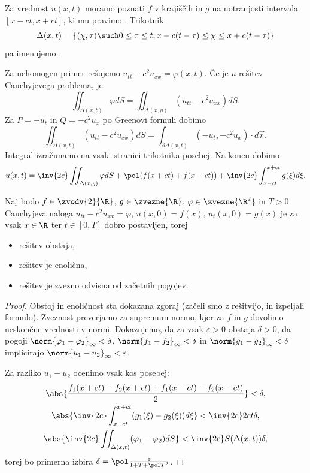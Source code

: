 
Za vrednost $u(x,t)$ moramo poznati $f$ v krajiščih in $g$ na notranjosti
intervala $[x-ct, x+ct]$, ki mu pravimo .
Trikotnik
\[
  \Delta(x,t) = \{ (\chi, \tau) \such 0 \le \tau \le t, x - c (t-\tau) \le \chi \le
  x + c (t-\tau) \}
\]
pa imenujemo .

Za nehomogen primer rešujemo $u_{tt} - c^2 u_{xx} = \varphi(x, t)$.
Če je $u$ rešitev Cauchyjevega problema, je
\[
  \iint_{\Delta(x,t)} \varphi dS = \iint_{\Delta(x,y)} (u_{tt} - c^2 u_{xx}) dS.
\]
Za $P = - u_t$ in $Q = -c^2 u_x$ po Greenovi formuli dobimo
\[
  \iint_{\Delta(x,t)} (u_{tt} - c^2 u_{xx}) dS
  = \int_{\partial \Delta(x,t)} (-u_t, -c^2 u_x) \cdot d\vec{r}.
\]
Integral izračunamo na vsaki stranici trikotnika posebej.
Na koncu dobimo
\[
  u(x,t) = \inv{2c} \iint_{\Delta(x,y)} \varphi dS
  + \pol (f(x+ct) + f(x - ct)) + \inv{2c} \int_{x-ct}^{x+ct} g(\xi) d\xi.
\]


\begin{izrek}
  Naj bodo $f \in \zvodv{2}{\R}$, $g \in \zvezne{\R}$, $\varphi \in
  \zvezne{\R^2}$ in $T > 0$.
  Cauchyjeva naloga $u_{tt} - c^2 u_{xx} = \varphi$, $u(x,0) = f(x)$,
  $u_t(x,0) = g(x)$ je za vsak $x \in \R$ ter $t \in [0,T]$ dobro postavljen,
  torej
  \begin{itemize}
  \item rešitev obstaja,
  \item rešitev je enolična,
  \item rešitev je zvezno odvisna od začetnih pogojev.
  \end{itemize}
\end{izrek}

\begin{proof}
  Obstoj in enoličnost sta dokazana zgoraj (začeli smo z rešitvijo, in izpeljali
  formulo).
  Zveznost preverjamo za supremum normo, kjer za $f$ in $g$ dovolimo neskončne
  vrednosti v normi.
  Dokazujemo, da za vsak $\varepsilon > 0$ obstaja $\delta > 0$, da pogoji
  $\norm{\varphi_1 - \varphi_2}_\infty < \delta$, $\norm{f_1 - f_2}_\infty <
  \delta$ in $\norm{g_1 - g_2}_\infty < \delta$ implicirajo $\norm{u_1 -
	u_2}_\infty < \varepsilon$.

  Za razliko $u_1 - u_2$ ocenimo vsak kos posebej:
  \begin{gather*}
	\abs{\frac{f_1(x+ct) - f_2(x+ct) + f_1(x-ct) - f_2(x-ct)}{2}} < \delta, \\
	\abs{\inv{2c} \int_{x - ct}^{x+ct} (g_1(\xi) - g_2(\xi)) d\xi} < \inv{2c}
	2ct \delta, \\
	\abs{\inv{2c} \iint_{\Delta(x,t)} (\varphi_1 - \varphi_2) dS} < \inv{2c}
	S(\Delta(x,t)) \delta,
  \end{gather*}
  torej bo primerna izbira $\delta = \pol \frac{\varepsilon}{1 + T + \pol T^2}$.
\end{proof}


